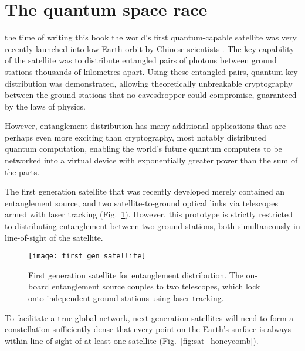 %
%

\section{The quantum space race}\label{sec:quant_space_race_essay}

 the time of writing this book the world's first quantum-capable satellite was very recently launched into low-Earth orbit by Chinese scientists \cite{JWP}. The key capability of the satellite was to distribute entangled pairs of photons between ground stations thousands of kilometres apart. Using these entangled pairs, quantum key distribution was demonstrated, allowing theoretically unbreakable cryptography between the ground stations that no eavesdropper could compromise, guaranteed by the laws of physics.

However, entanglement distribution has many additional applications that are perhaps even more exciting than cryptography, most notably distributed quantum computation, enabling the world's future quantum computers to be networked into a virtual device with exponentially greater power than the sum of the parts.

The first generation satellite that was recently developed merely contained an entanglement source, and two satellite-to-ground optical links via telescopes armed with laser tracking (Fig.~\ref{fig:first_gen_sat}). However, this prototype is strictly restricted to distributing entanglement between two ground stations, both simultaneously in line-of-sight of the satellite.

\begin{figure}[!htbp]
\texttt{[image: first\_gen\_satellite]}
\captionspace \caption{First generation satellite for entanglement distribution. The on-board entanglement source couples to two telescopes, which lock onto independent ground stations using laser tracking.}\label{fig:first_gen_sat}	
\end{figure}

To facilitate a true global network, next-generation satellites will need to form a constellation sufficiently dense that every point on the Earth's surface is always within line of sight of at least one satellite (Fig.~\ref{fig:sat_honeycomb}).

